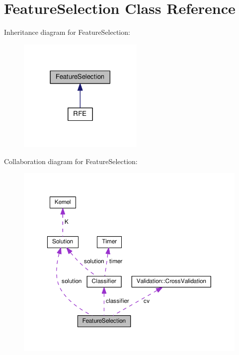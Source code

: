 \hypertarget{class_feature_selection}{}\section{Feature\+Selection Class Reference}
\label{class_feature_selection}


Inheritance diagram for Feature\+Selection\+:\nopagebreak
\begin{figure}[H]
\begin{center}
\leavevmode
\includegraphics[width=170pt]{class_feature_selection__inherit__graph}
\end{center}
\end{figure}


Collaboration diagram for Feature\+Selection\+:\nopagebreak
\begin{figure}[H]
\begin{center}
\leavevmode
\includegraphics[width=350pt]{class_feature_selection__coll__graph}
\end{center}
\end{figure}
